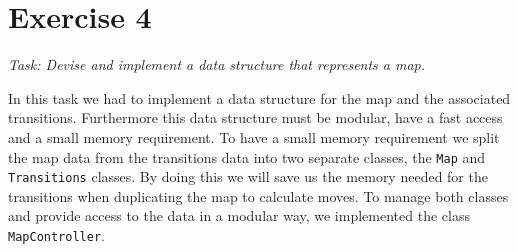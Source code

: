 \section{Exercise 4}
\textit{Task: Devise and implement a data structure that represents a map.} \newline

\noindent In this task we had to implement a data structure for the map and the associated transitions. Furthermore this data structure must be modular, have a fast access and a small memory requirement. \newline
\noindent To have a small memory requirement we split the map data from the transitions data into two separate classes, the \texttt{Map} and \texttt{Transitions} classes. By doing this we will save us the memory needed for the transitions when duplicating the map to calculate moves. To manage both classes and provide access to the data in a modular way, we implemented the class \texttt{MapController}.

